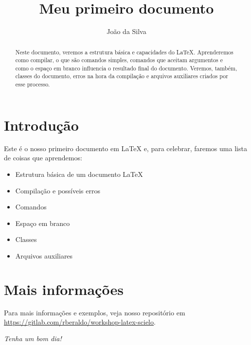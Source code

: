 \documentclass[11pt,a4paper,oneside]{article}
\title{Meu primeiro documento}
\author{João da Silva}
\begin{document}
\frenchspacing

\maketitle

\begin{abstract}
  Neste documento, veremos a estrutura básica e capacidades do \LaTeX.
  Aprenderemos como compilar, o que são comandos simples, comandos que aceitam
  argumentos e como o espaço em branco influencia o resultado final do
  documento. Veremos, também, classes do documento, erros na hora da compilação
  e arquivos auxiliares criados por esse processo.
\end{abstract}

\tableofcontents

\section{Introdução}

Este é o nosso primeiro documento em \LaTeX{} e, para celebrar, faremos uma
lista de coisas que aprendemos:

\begin{itemize}
  \item Estrutura básica de um documento \LaTeX
  \item Compilação e possíveis erros
  \item Comandos
  \item Espaço em branco
  \item Classes
  \item Arquivos auxiliares
\end{itemize}

\section{Mais informações}

Para mais informações e exemplos, veja nosso repositório em
\url{https://gitlab.com/rberaldo/workshop-latex-scielo}.

\begin{center}
  \textit{Tenha um bom dia!}
\end{center}
\end{document}
